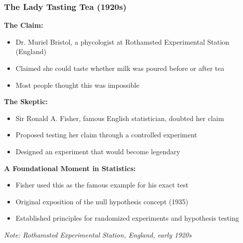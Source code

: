 \documentclass{beamer}
\begin{document}
\begin{frame}
\frametitle{The Lady Tasting Tea (1920s)}
\textbf{The Claim:}
\begin{itemize}
\item Dr. Muriel Bristol, a phycologist at Rothamsted Experimental Station (England)
\item Claimed she could taste whether milk was poured before or after tea
\item Most people thought this was impossible
\end{itemize}

\vspace{0.2cm}
\textbf{The Skeptic:}
\begin{itemize}
\item Sir Ronald A. Fisher, famous English statistician, doubted her claim
\item Proposed testing her claim through a controlled experiment
\item Designed an experiment that would become legendary
\end{itemize}

\vspace{0.2cm}
\textbf{A Foundational Moment in Statistics:}
\begin{itemize}
\item Fisher used this as the famous example for his exact test
\item Original exposition of the null hypothesis concept (1935)
\item Established principles for randomized experiments and hypothesis testing
\end{itemize}

\vspace{0.1cm}
\small{\textit{Note: Rothamsted Experimental Station, England, early 1920s}}
\end{frame}
\end{document}
